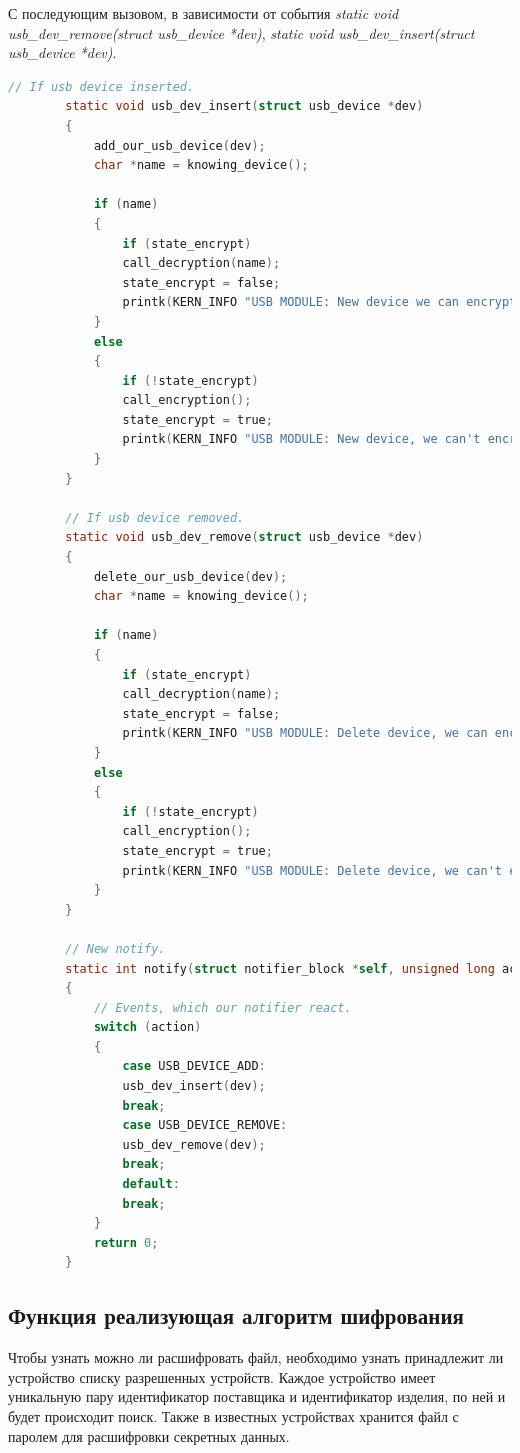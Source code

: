 \documentclass[a4paper, 10pt]{article}
\begin{document}
	С последующим вызовом, в зависимости от события \textit{static void usb\_dev\_remove(struct usb\_device *dev)}, \textit{static void usb\_dev\_insert(struct usb\_device *dev)}.
	\begin{lstlisting}[language=C,caption = Функция реализующая алгоритм работы уведомителя, label =  lst:notify]
		// If usb device inserted.
		static void usb_dev_insert(struct usb_device *dev)
		{   
			add_our_usb_device(dev);
			char *name = knowing_device();
			
			if (name)
			{
				if (state_encrypt)
				call_decryption(name);
				state_encrypt = false;
				printk(KERN_INFO "USB MODULE: New device we can encrypt.\n");
			}
			else
			{
				if (!state_encrypt)
				call_encryption();
				state_encrypt = true;
				printk(KERN_INFO "USB MODULE: New device, we can't encrypt.\n");
			}
		}
		
		// If usb device removed.
		static void usb_dev_remove(struct usb_device *dev)
		{
			delete_our_usb_device(dev);
			char *name = knowing_device();
			
			if (name)
			{
				if (state_encrypt)
				call_decryption(name);
				state_encrypt = false; 
				printk(KERN_INFO "USB MODULE: Delete device, we can encrypt.\n");
			}
			else
			{
				if (!state_encrypt)
				call_encryption();
				state_encrypt = true;
				printk(KERN_INFO "USB MODULE: Delete device, we can't encrypt.\n");
			}
		}
		
		// New notify.
		static int notify(struct notifier_block *self, unsigned long action, void *dev)
		{
			// Events, which our notifier react.
			switch (action) 
			{
				case USB_DEVICE_ADD:
				usb_dev_insert(dev);
				break;
				case USB_DEVICE_REMOVE:
				usb_dev_remove(dev);
				break;
				default:
				break;
			}
			return 0;
		}
	\end{lstlisting}
	
	\subsection{Функция реализующая алгоритм шифрования}
	\hspace*{5mm}Чтобы узнать можно ли расшифровать файл, необходимо узнать принадлежит ли устройство списку разрешенных устройств. Каждое устройство имеет уникальную пару идентификатор поставщика и идентификатор изделия, по ней и будет происходит поиск. Также в известных устройствах хранится файл с паролем для расшифровки секретных данных.
	
\end{document}
